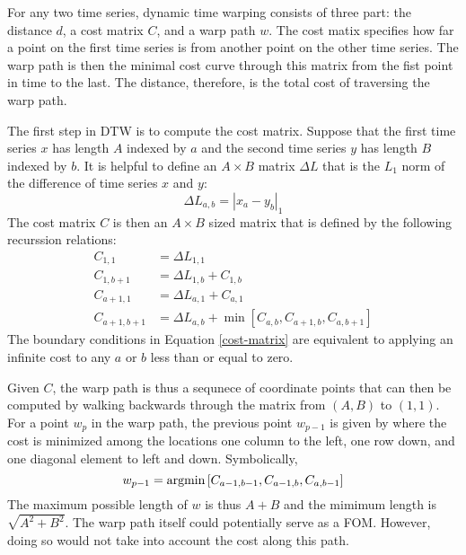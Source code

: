 For any two time series, dynamic time warping consists of three part:
the distance $d$, a cost matrix $C$, and a warp path $w$. The cost matix 
specifies how far a point on the first time series is from another point on the 
other time series.  The warp path is then the minimal cost curve through this 
matrix from the fist point in time to the last. The distance, therefore, is the
total cost of traversing the warp path.

The first step in DTW is to compute the cost matrix. Suppose that the first 
time series $x$ has length $A$ indexed by $a$ and the second time series $y$ has 
length $B$ indexed by $b$. It is helpful to define an $A\times B$ matrix $\Delta L$
that is the $L_1$ norm of the difference of time series $x$ and $y$:
\begin{equation}
\label{delta-l1}
\Delta L_{a,b} = \left|x_a - y_b\right|_1
\end{equation}
The cost matrix $C$ is then an $A\times B$ sized matrix that is defined by the 
following recurssion relations:
\begin{equation}
\label{cost-matrix}
\begin{split}
C_{1,1} & = \Delta L_{1,1}\\
C_{1,b+1} & = \Delta L_{1,b} + C_{1,b}\\
C_{a+1,1} & = \Delta L_{a,1} + C_{a,1}\\
C_{a+1,b+1} & = \Delta L_{a,b} + \min\left[C_{a,b}, C_{a+1,b}, C_{a,b+1}\right]
\end{split}
\end{equation}
The boundary conditions in Equation \ref{cost-matrix} are equivalent to applying 
an infinite cost to any $a$ or $b$ less than or equal to zero.

Given $C$, the warp path is thus a sequnece of coordinate points that can then be 
computed by walking backwards through the matrix from $(A, B)$ to $(1, 1)$.
For a point $w_p$ in the warp path, the previous point $w_{p-1}$ is given by 
where the cost is minimized among the locations one column to the left, one row
down, and one diagonal element to left and down. Symbolically, 
\begin{equation}
\label{warp-path}
w_{p-1} = \mathrm{argmin}\left[C_{a-1,b-1}, C_{a-1,b}, C_{a,b-1}\right]
\end{equation}
The maximum possible length of $w$ is thus $A + B$ and the mimimum length is 
$\sqrt{A^2 + B^2}$. The warp path itself could potentially serve as a FOM.  
However, doing so would not take into account the cost along this path.

